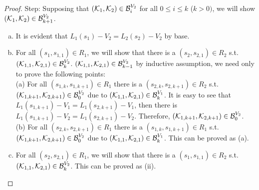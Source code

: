 \documentclass{article}
\begin{document}
\begin{proof}
 Step: Supposing that $({\cal K}_1, {\cal K}_2) \in {\cal B}_i^{V_2}$ for all $0 \leq i \leq k$ ($k > 0)$, we will show $({\cal K}_1, {\cal K}_2) \in {\cal B}_{k+1}^{V_2}$.
 \begin{enumerate} [(a)]
   \item It is evident that $L_1(s_1) - V_2 = L_2(s_2) - V_2$ by base.
   \item For all $(s_1, s_{1,1}) \in R_1$, we will show that there is a $(s_2, s_{2, 1}) \in R_2$ s.t.\ $({\cal K}_{1,1}, {\cal K}_{2,1})\in {\cal B}_k^{V_2}$. $({\cal K}_{1,1}, {\cal K}_{2,1})\in {\cal B}_{k-1}^{V_2}$ by inductive assumption, we need only to prove the following points:\\
       (a) For all $(s_{1, k}, s_{1, k+1}) \in R_1$ there is a $(s_{2, k}, s_{2, k+1})\in R_2$ s.t.\ $({\cal K}_{1,k+1}, {\cal K}_{2,k+1})\in {\cal B}_0^{V_2}$ due to $({\cal K}_{1,1}, {\cal K}_{2,1})\in {\cal B}_{k}^{V_1}$. It is easy to see that $L_1(s_{1, k+1}) - V_1 = L_1(s_{2, k+1}) - V_1$, then there is $L_1(s_{1, k+1})- V_2 = L_1(s_{2, k+1}) - V_2$. Therefore, $({\cal K}_{1,k+1}, {\cal K}_{2,k+1})\in {\cal B}_0^{V_2}$.\\
       (b) For all $(s_{2, k}, s_{2, k+1}) \in R_1$ there is a $(s_{1, k}, s_{1, k+1}) \in R_1$ s.t.\ $({\cal K}_{1,k+1}, {\cal K}_{2,k+1})\in {\cal B}_0^{V_2}$ due to $({\cal K}_{1,1}, {\cal K}_{2,1})\in {\cal B}_{k}^{V_1}$. This can be proved as (a).
   \item For all $(s_2, s_{2,1}) \in R_1$, we will show that there is a $(s_1, s_{1, 1}) \in R_2$ s.t.\ $({\cal K}_{1,1}, {\cal K}_{2,1})\in {\cal B}_k^{V_2}$. This can be proved as (ii).
 \end{enumerate}

 \end{proof}

\end{document}
